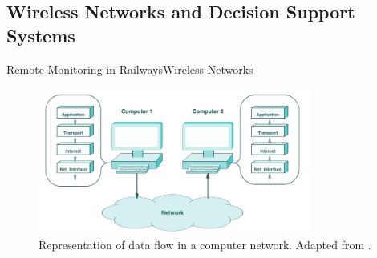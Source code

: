 \subsection{Wireless Networks and Decision Support Systems}

\begin{frame}{Remote Monitoring in Railways}{Wireless Networks}

\begin{figure}[h!]
	\centering
	\includegraphics[width=0.8\textwidth,keepaspectratio]{figures/33.WirelessN/comer2008}
	\caption{Representation of data flow in a computer network. Adapted from \cite{comer2008}.}
\end{figure}

\end{frame}


